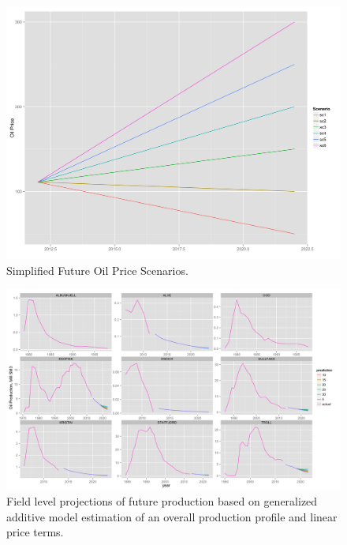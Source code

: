 \documentclass[12pt]{article}
\begin{document}
\begin{figure}
	\includegraphics[width=1\textwidth]{figures/price_scenario_print.png}
	\caption{Simplified Future Oil Price Scenarios.}
	\label{price_scenario}
\end{figure}

\begin{figure}
	\includegraphics[width=1\textwidth]{figures/field_lev_forecast_print.png}
	\caption{Field level projections of future production based on generalized additive model estimation of an overall production profile and linear price terms.}
	\label{field_lev_forecast}
\end{figure}
\end{document}
